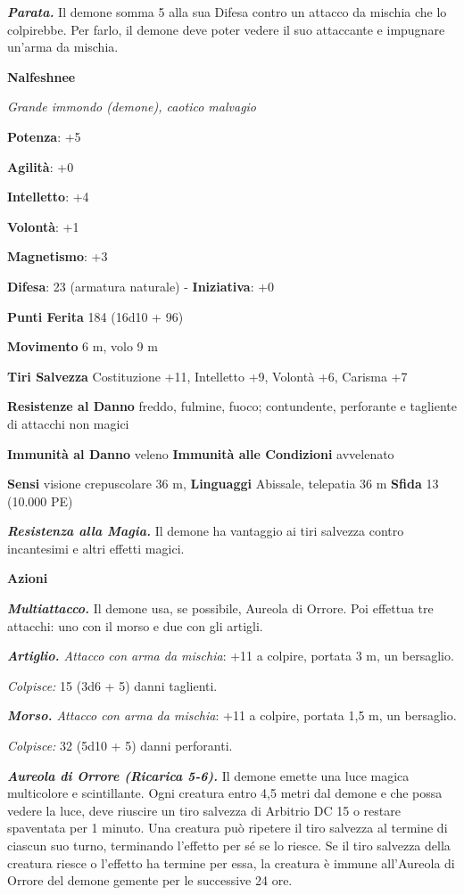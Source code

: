 \begin{multicols}{2}
\emph{\textbf{Parata.}} Il demone somma 5 alla sua Difesa contro un attacco
da mischia che lo colpirebbe. Per farlo, il demone deve poter vedere il
suo attaccante e impugnare un'arma da mischia.

\textbf{Nalfeshnee}

\emph{Grande immondo (demone), caotico malvagio}

\textbf{Potenza}: +5

\textbf{Agilità}: +0

\textbf{Intelletto}: +4

\textbf{Volontà}: +1

\textbf{Magnetismo}: +3

\textbf{Difesa}: 23 (armatura naturale) - \textbf{Iniziativa}: +0

\textbf{Punti Ferita} 184 (16d10 + 96)

\textbf{Movimento} 6 m, volo 9 m

\textbf{Tiri Salvezza} Costituzione +11, Intelletto +9, Volontà +6,
Carisma +7

\textbf{Resistenze al Danno} freddo, fulmine, fuoco; contundente,
perforante e tagliente di attacchi non magici

\textbf{Immunità al Danno} veleno \textbf{Immunità alle Condizioni}
avvelenato

\textbf{Sensi} visione crepuscolare 36 m, 
\textbf{Linguaggi} Abissale, telepatia 36 m \textbf{Sfida} 13 (10.000
PE)

\emph{\textbf{Resistenza alla Magia.}} Il demone ha vantaggio ai tiri
salvezza contro incantesimi e altri effetti magici.

\textbf{Azioni}

\emph{\textbf{Multiattacco.}} Il demone usa, se possibile, Aureola di
Orrore. Poi effettua tre attacchi: uno con il morso e due con gli
artigli.

\emph{\textbf{Artiglio.} Attacco con arma da mischia}: +11 a colpire,
portata 3 m, un bersaglio.

\emph{Colpisce:} 15 (3d6 + 5) danni taglienti.

\emph{\textbf{Morso.} Attacco con arma da mischia}: +11 a colpire,
portata 1,5 m, un bersaglio.

\emph{Colpisce:} 32 (5d10 + 5) danni perforanti.

\emph{\textbf{Aureola di Orrore (Ricarica 5-6).}} Il demone emette una
luce magica multicolore e scintillante. Ogni creatura entro 4,5 metri
dal demone e che possa vedere la luce, deve riuscire un tiro salvezza di Arbitrio DC 15 o restare spaventata per 1 minuto. Una creatura può
ripetere il tiro salvezza al termine di ciascun suo turno, terminando
l'effetto per sé se lo riesce. Se il tiro salvezza della creatura riesce
o l'effetto ha termine per essa, la creatura è immune all'Aureola di
Orrore del demone gemente per le successive 24 ore.


\end{multicols}
